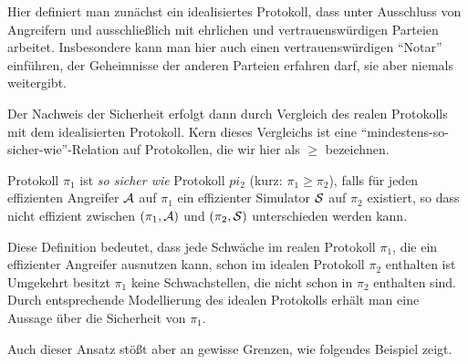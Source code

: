 Hier definiert man zunächst ein idealisiertes Protokoll, dass unter Ausschluss von Angreifern und ausschließlich mit ehrlichen und vertrauenswürdigen Parteien arbeitet.
Insbesondere kann man hier auch einen vertrauenswürdigen "`Notar"' einführen, der Geheimnisse der anderen Parteien erfahren darf, sie aber niemals weitergibt.

Der Nachweis der Sicherheit erfolgt dann durch Vergleich des realen Protokolls mit dem idealisierten Protokoll. Kern dieses Vergleichs ist eine "`mindestens-so-sicher-wie"'-Relation auf Protokollen, die wir hier als $\geq$ bezeichnen.\\

\begin{definition}
    Protokoll $\pi_1$ ist \emph{so sicher wie} Protokoll $pi_2$ (kurz: $\pi_1 \geq \pi_2$), falls
    für jeden effizienten Angreifer $\mathcal{A}$ auf $\pi_1$
    ein effizienter Simulator $\mathcal{S}$ auf $\pi_2$ existiert, so dass
    nicht effizient zwischen $(\pi_1,\mathcal{A})$ und $(\pi_2,\mathcal{S})$
    unterschieden werden kann.
\end{definition}

Diese Definition bedeutet, dass jede Schwäche im realen Protokoll $\pi_1$, die ein effizienter Angreifer ausnutzen kann, schon im idealen Protokoll $\pi_2$ enthalten ist
Umgekehrt besitzt $\pi_1$ keine Schwachstellen, die nicht schon in $\pi_2$ enthalten sind.
Durch entsprechende Modellierung des idealen Protokolls erhält man eine Aussage über die Sicherheit von $\pi_1$.

Auch dieser Ansatz stößt aber an gewisse Grenzen, wie folgendes Beispiel zeigt.\\

